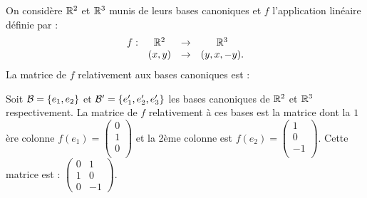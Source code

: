 \begin{question}
On considère $\mathbb{R}^2$ et $\mathbb{R}^3$ munis de leurs bases canoniques et $f$ l'application linéaire définie par :
$$\begin{array}{rccc}f:&\mathbb{R}^2 &\to& \mathbb{R}^3\\
& (x,y)&\to &(y,x,-y).  \end{array}$$
La matrice de $f$ relativement aux bases canoniques est :
\begin{answers}  
\end{answers}
\begin{explanations} Soit ${\cal {B}}=\{e_1,e_2\}$  et ${\cal {B}}'=\{e_1',e_2',e_3'\}$ les bases canoniques de  $\mathbb{R}^2$ et  $\mathbb{R}^3$ respectivement. La matrice de $f$  relativement à ces bases est la matrice dont la $1$ère colonne $f(e_1)=\left(\begin{array}{r}
0\\1\\0\\\end{array}\right)$ et la 2ème colonne est $f(e_2)=\left(\begin{array}{r}1\\0\\-1\\
\end{array}\right)$. Cette matrice est : 
 $\left(\begin{array}{rc}0&1\\
1&0\\0&-1\end{array}\right).$
\end{explanations}
\end{question}

